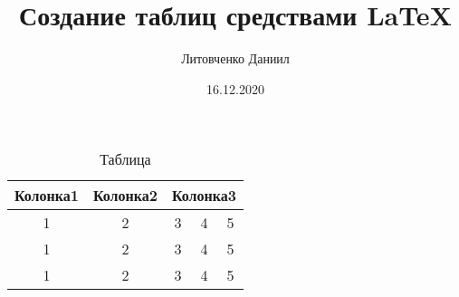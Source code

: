 \documentclass[a4paper,12pt]{article} %
\author{Литовченко Даниил}
\title{Создание таблиц средствами \LaTeX{}}
\date{16.12.2020}
\begin{document}

\maketitle
\newpage
\begin{table}
\caption{\label{tab:one}  Таблица}
\begin{center}
\begin{tabular}{|c|c|c|c|c|}
\hline 
Колонка1 & Колонка2
& \multicolumn{3}{|c|}{Колонка3} \\
\cline{3-5}
\hline

1 & 2 & 3 & 4 & 5\\
\hline
1 & 2 & 3 & 4 & 5 \\
\hline
1 & 2 & 3 & 4 & 5\\
\hline
\end{tabular}
\end{center}
\end{table}
\end{document}
